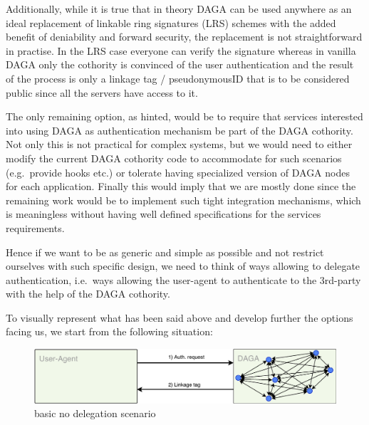     Additionally, while it is true that in theory DAGA can be used anywhere as an ideal replacement of linkable
    ring signatures (LRS) schemes with the added benefit of deniability and forward security\cite{syta_identity_2015},
    the replacement is not straightforward in practise.
    In the LRS case everyone can verify the signature whereas in vanilla DAGA only the cothority is convinced
    of the user authentication
    and the result of the process is only a linkage tag / pseudonymousID that is to be considered public since all the servers
    have access to it.

    The only remaining option, as hinted, would be to require that services interested into using DAGA as authentication mechanism
    be part of the DAGA cothority.
    Not only this is not practical for complex systems, but we would need to either modify the current DAGA cothority code
    to accommodate for such scenarios (e.g.\ provide hooks etc.) or tolerate having specialized version of DAGA nodes for each application.
    Finally this would imply that we are mostly done since the remaining work would be to implement such tight integration mechanisms,
    which is meaningless without having well defined specifications for the services requirements.

    Hence if we want to be as generic and simple as possible and not restrict ourselves with such specific design,
    we need to think of ways allowing to delegate authentication, i.e.\ ways allowing the user-agent to authenticate to the 3rd-party
    with the help of the DAGA cothority.

    To visually represent what has been said above and develop further the options facing us, we start from the following situation:
    \begin{figure}
        \includegraphics[width=\linewidth]{images/login0_daga.pdf}
        \caption{basic no delegation scenario}
        \label{fig:login0}
    \end{figure}

